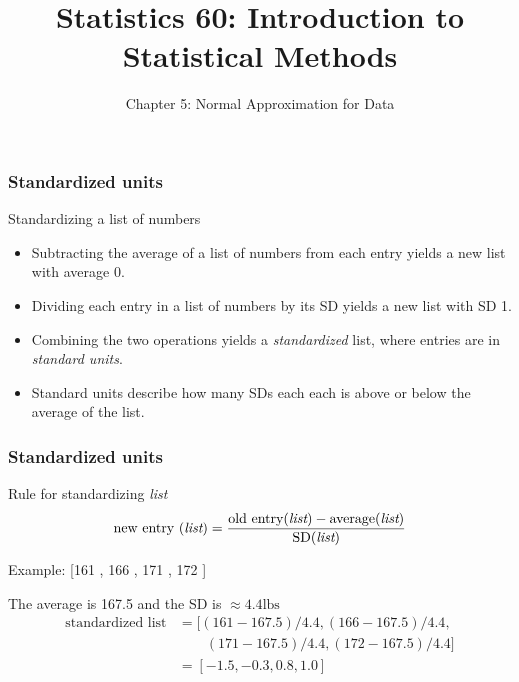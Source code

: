 \documentclass[handout]{beamer}
\title{Statistics 60: Introduction to Statistical Methods}
\subtitle{Chapter 5: Normal Approximation for Data}
\author{}%
\begin{document}
   \begin{frame}
   \titlepage
   \end{frame}


   \begin{frame} \frametitle{Standardized units}

   \begin{block}
   {Standardizing a list of numbers}
   \begin{itemize}
   \item Subtracting the average of a list of numbers from each
   entry yields a new list with average 0.
   \item Dividing each entry in a list of numbers by its SD
   yields a new list with SD 1.
   \item Combining the two operations yields a {\em standardized} list,
   where entries are in {\em standard units}.
   \item Standard units describe how many SDs each each is above or below the
   average of the list.
   \end{itemize}
   \end{block}
   \end{frame}


   \begin{frame} \frametitle{Standardized units}

   \begin{block}
   {Rule for standardizing {\em list}}
   $$
   \text{new entry ({\em list})} = \frac{\text{old entry({\em list})} - \text{average({\em list})}}{\text{SD({\em list})}}
   $$
   \end{block}

   \begin{block}
   {Example: [161 , 166 , 171 , 172 ]}


   The average is 167.5  and the  SD is $\approx 4.4 \text{lbs}$
   $$
   \begin{aligned}
   \text{standardized list} &= [(161-167.5)/4.4,   (166-167.5)/4.4, \\
   & \qquad (171-167.5)/4.4, (172-167.5)/4.4] \\
   &= [-1.5,-0.3,0.8,1.0]
   \end{aligned}
   $$

   \end{block}
   \end{frame}
\end{document}
